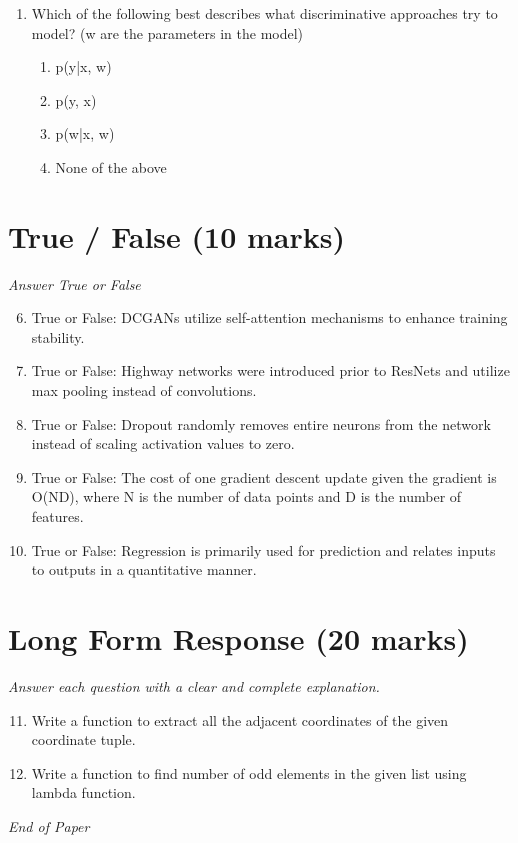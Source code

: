 \documentclass[12pt]{article}
\begin{document}
\begin{enumerate}[label=\arabic*.]
\begin{enumerate}[label=(\alph*)]
    \item P(H, U, P, W) = P(H) * P(W) * P(P | W) * P(W | H, P)
    \item P(H, U, P, W) = P(H) * P(W) * P(P | W) * P(U | H, P)
    \item None of the above
\end{enumerate}
\item Which of the following best describes what discriminative approaches try to model? (w are the parameters in the model)
\begin{enumerate}[label=(\alph*)]
    \item p(y|x, w)
    \item p(y, x)
    \item p(w|x, w)
    \item None of the above
\end{enumerate}
\end{enumerate}

\section*{True / False (10 marks)}
\textit{Answer True or False}
\begin{enumerate}[label=\arabic*.]
\setcounter{enumi}{5}
\item True or False: DCGANs utilize self-attention mechanisms to enhance training stability.
\item True or False: Highway networks were introduced prior to ResNets and utilize max pooling instead of convolutions.
\item True or False: Dropout randomly removes entire neurons from the network instead of scaling activation values to zero.
\item True or False: The cost of one gradient descent update given the gradient is O(ND), where N is the number of data points and D is the number of features.
\item True or False: Regression is primarily used for prediction and relates inputs to outputs in a quantitative manner.
\end{enumerate}

\section*{Long Form Response (20 marks)}
\textit{Answer each question with a clear and complete explanation.}
\begin{enumerate}[label=\arabic*.]
\setcounter{enumi}{10}
\item Write a function to extract all the adjacent coordinates of the given coordinate tuple.
\item Write a function to find number of odd elements in the given list using lambda function.
\end{enumerate}

\vfill
\noindent\textit{End of Paper}
\end{document}
